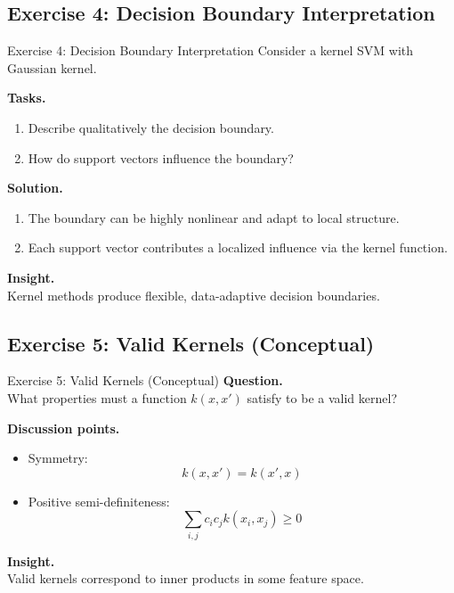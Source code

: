 \documentclass[aspectratio=169,11pt]{beamer}
\begin{document}
\subsection{Exercise 4: Decision Boundary Interpretation}
\begin{frame}[t,allowframebreaks]{Exercise 4: Decision Boundary Interpretation}
\small
Consider a kernel SVM with Gaussian kernel.

\textbf{Tasks.}\\ \begin{enumerate}
    \item Describe qualitatively the decision boundary.
    \item How do support vectors influence the boundary?
\end{enumerate}

\textbf{Solution.}\\ \begin{enumerate}
\item The boundary can be highly nonlinear and adapt to local structure.

\item Each support vector contributes a localized influence via the kernel function.
\end{enumerate}

\textbf{Insight.}\\ Kernel methods produce flexible, data-adaptive decision boundaries.
\end{frame}

\subsection{Exercise 5: Valid Kernels (Conceptual)}
\begin{frame}[t,allowframebreaks]{Exercise 5: Valid Kernels (Conceptual)}
\small
\textbf{Question.}\\ What properties must a function $k(x,x')$ satisfy to be a valid kernel?

\textbf{Discussion points.}\\ \begin{itemize}
    \item Symmetry:
    \[
    k(x,x') = k(x',x)
    \]
    \item Positive semi-definiteness:
    \[
    \sum_{i,j} c_i c_j k(x_i, x_j) \geq 0
    \]
\end{itemize}

\textbf{Insight.}\\ Valid kernels correspond to inner products in some feature space.
\end{frame}
\end{document}
